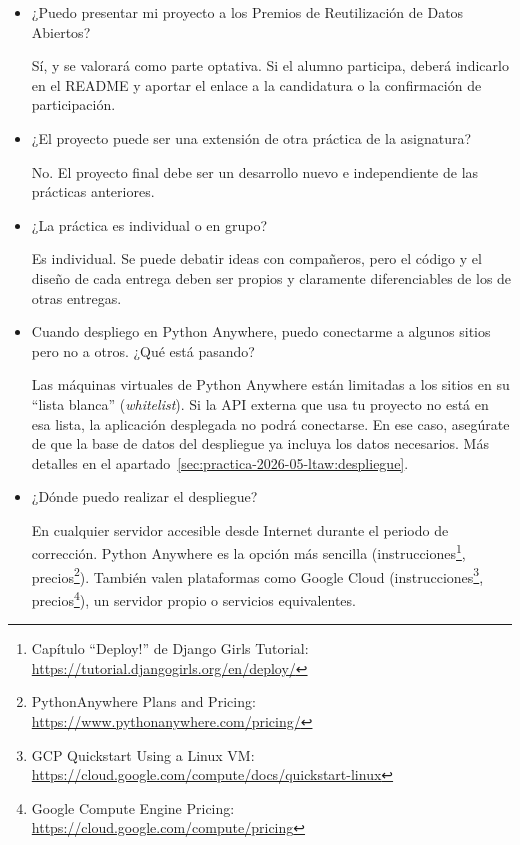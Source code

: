 \begin{itemize}
\item ¿Puedo presentar mi proyecto a los Premios de Reutilización de Datos Abiertos?

  Sí, y se valorará como parte optativa. Si el alumno participa, deberá indicarlo en el README y aportar el enlace a la candidatura o la confirmación de participación.

\item ¿El proyecto puede ser una extensión de otra práctica de la asignatura?

  No. El proyecto final debe ser un desarrollo nuevo e independiente de las prácticas anteriores.

\item ¿La práctica es individual o en grupo?

  Es individual. Se puede debatir ideas con compañeros, pero el código y el diseño de cada entrega deben ser propios y claramente diferenciables de los de otras entregas.

\item Cuando despliego en Python Anywhere, puedo conectarme a algunos sitios pero no a otros. ¿Qué está pasando?

  Las máquinas virtuales de Python Anywhere están limitadas a los sitios en su ``lista blanca'' (\emph{whitelist}). Si la API externa que usa tu proyecto no está en esa lista, la aplicación desplegada no podrá conectarse. En ese caso, asegúrate de que la base de datos del despliegue ya incluya los datos necesarios. Más detalles en el apartado~\ref{sec:practica-2026-05-ltaw:despliegue}.

\item ¿Dónde puedo realizar el despliegue?

  En cualquier servidor accesible desde Internet durante el periodo de corrección. Python Anywhere es la opción más sencilla (instrucciones\footnote{Capítulo ``Deploy!'' de Django Girls Tutorial:\\ \url{https://tutorial.djangogirls.org/en/deploy/}}, precios\footnote{PythonAnywhere Plans and Pricing:\\ \url{https://www.pythonanywhere.com/pricing/}}). También valen plataformas como Google Cloud (instrucciones\footnote{GCP Quickstart Using a Linux VM:\\ \url{https://cloud.google.com/compute/docs/quickstart-linux}}, precios\footnote{Google Compute Engine Pricing:\\ \url{https://cloud.google.com/compute/pricing}}), un servidor propio o servicios equivalentes.


\end{itemize}
